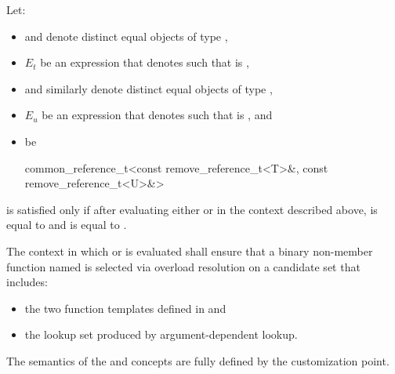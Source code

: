 \begin{removedblock}
\begin{itemdescr}
\pnum
Let:
\begin{itemize}
\item {} and  denote distinct equal objects of type
  ,
\item $E_t$ be an expression that denotes  such that
   is ,
\item {} and  similarly denote distinct equal objects of type
  ,
\item $E_u$ be an expression that denotes  such that
   is , and
\item {} be
  \begin{codeblock}
    common_reference_t<const remove_reference_t<T>&, const remove_reference_t<U>&>
  \end{codeblock}
\end{itemize}
 is satisfied only if after evaluating
either  or  in the context
described above,  is equal to  and  is
equal to .

\pnum
The context in which  or 
is evaluated shall ensure that a binary non-member function named  is
selected via overload resolution on a candidate set that
includes:
\begin{itemize}
\item the two  function templates defined in
   and
\item the lookup set produced by argument-dependent
  lookup.
\end{itemize}
\end{itemdescr}
\end{removedblock}

\begin{addedblock}
\pnum
\begin{note}
The semantics of the  and 
concepts are fully defined by the  customization point.
\end{note}
\end{addedblock}

